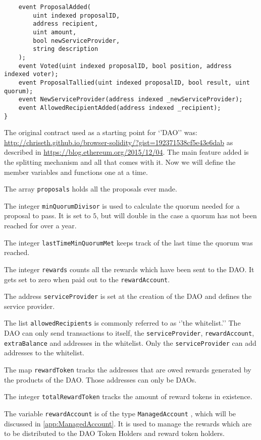 \documentclass[9pt,oneside]{amsart}
\begin{document}
\begin{verbatim}
    event ProposalAdded(
        uint indexed proposalID,
        address recipient,
        uint amount,
        bool newServiceProvider,
        string description
    );
    event Voted(uint indexed proposalID, bool position, address indexed voter);
    event ProposalTallied(uint indexed proposalID, bool result, uint quorum);
    event NewServiceProvider(address indexed _newServiceProvider);
    event AllowedRecipientAdded(address indexed _recipient);
}

\end{verbatim}
\begin{multicols}{2}
The original contract used as a starting point for ‘’DAO’’ was: \url{http://chriseth.github.io/browser-solidity/?gist=192371538cf5e43e6dab} as described in 
\url{https://blog.ethereum.org/2015/12/04}. The main feature added is the splitting mechanism and all that comes with it.
Now we will define the member variables and functions one at a time. 

The array \verb|proposals| holds all the proposals ever made. 

The integer \verb|minQuorumDivisor| is used to calculate the quorum needed for a proposal to pass. It is set to $5$, but will double in the case a quorum has not been reached for over a year.

The integer \verb|lastTimeMinQuorumMet| keeps track of the last time the quorum was reached.

The integer \verb|rewards| counts all the rewards which have been sent to the DAO. It gets set to zero when paid out to the \verb|rewardAccount|.

The address \verb|serviceProvider| is set at the creation of the DAO and defines the service provider. 

The list \verb|allowedRecipients| is commonly referred to as ‘’the whitelist.’’ The DAO can only send transactions to itself, the \verb|serviceProvider|, \verb|rewardAccount|, \verb|extraBalance| and addresses in the whitelist. Only the \verb|serviceProvider| can add addresses to the whitelist. 

The map \verb|rewardToken| tracks the addresses that are owed rewards generated by the products of the DAO. Those addresses can only be DAOs.

The integer \verb|totalRewardToken| tracks the amount of reward tokens in existence.

The variable \verb|rewardAccount| is of the type \verb|ManagedAccount| , which will be discussed in \ref{app:ManagedAccount}. It is used to manage the rewards which are to be distributed to the DAO Token Holders and reward token holders.


\end{multicols}
\end{document}
